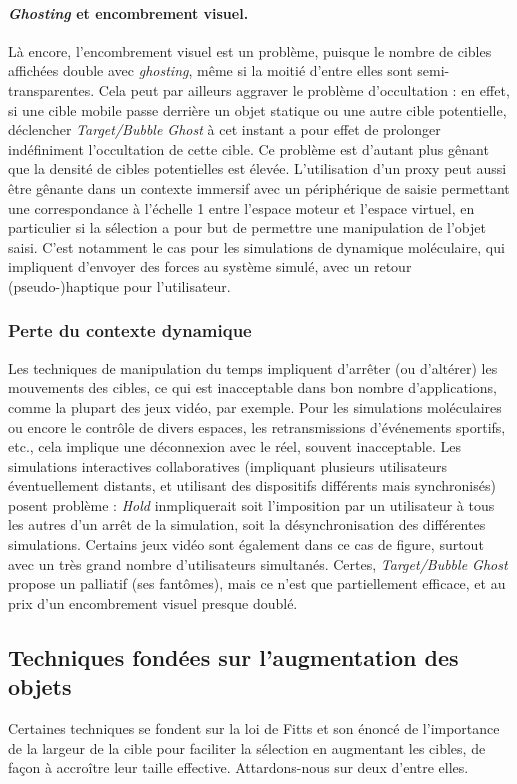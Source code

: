 	\paragraph{\emph{Ghosting} et encombrement visuel.}
	Là encore, l'encombrement visuel est un problème, puisque le nombre de cibles affichées double avec \emph{ghosting}, même si la moitié d'entre elles sont semi-transparentes. Cela peut par ailleurs aggraver le problème d'occultation : en effet, si une cible mobile passe derrière un objet statique ou une autre cible potentielle, déclencher \emph{Target/Bubble Ghost} à cet instant a pour effet de prolonger indéfiniment l'occultation de cette cible. Ce problème est d'autant plus gênant que la densité de cibles potentielles est élevée. L'utilisation d'un proxy peut aussi être gênante dans un contexte immersif avec un périphérique de saisie permettant une correspondance à l'échelle 1 entre l'espace moteur et l'espace virtuel, en particulier si la sélection a pour but de permettre une manipulation de l'objet saisi. C'est notamment le cas pour les simulations de dynamique moléculaire, qui impliquent d'envoyer des forces au système simulé, avec un retour (pseudo-)haptique pour l'utilisateur.
		
	\subsubsection{Perte du contexte dynamique}
	Les techniques de manipulation du temps impliquent d'arrêter (ou d'altérer) les mouvements des cibles, ce qui est inacceptable dans bon nombre d'applications, comme la plupart des jeux vidéo, par exemple. Pour les simulations moléculaires ou encore le contrôle de divers espaces, les retransmissions d'événements sportifs, etc., cela implique une déconnexion avec le réel, souvent inacceptable. Les simulations interactives collaboratives (impliquant plusieurs utilisateurs éventuellement distants, et utilisant des dispositifs différents mais synchronisés) posent problème : \emph{Hold} inmpliquerait soit l'imposition par un utilisateur à tous les autres d'un arrêt de la simulation, soit la désynchronisation des différentes simulations. Certains jeux vidéo sont également dans ce cas de figure, surtout avec un très grand nombre d'utilisateurs simultanés. Certes, \emph{Target/Bubble Ghost} propose un palliatif (ses fantômes), mais ce n'est que partiellement efficace, et au prix d'un encombrement visuel presque doublé.
	
	\subsection{Techniques fondées sur l'augmentation des objets}
	\label{sub:techAug}
	Certaines techniques se fondent sur la loi de Fitts et son énoncé de l'importance de la largeur de la cible pour faciliter la sélection en augmentant les cibles, de façon à accroître leur taille effective. Attardons-nous sur deux d'entre elles.

